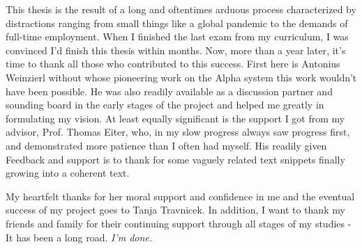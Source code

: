 \documentclass[draft,final]{vutinfth} %
\theoremstyle{definition}
\begin{document}
\begin{acknowledgements*}
This thesis is the result of a long and oftentimes arduous process characterized by distractions ranging from small things like a global pandemic to the demands of full-time employment. When I finished the last exam from my curriculum, I was convinced I'd finish this thesis within months. Now, more than a year later, it's time to thank all those who contributed to this success. First here is Antonius Weinzierl without whose pioneering work on the Alpha system this work wouldn't have been possible. He was also readily available as a discussion partner and sounding board in the early stages of the project and helped me greatly in formulating my vision. At least equally significant is the support I got from my advisor, Prof. Thomas Eiter, who, in my slow progress always saw progress first, and demonstrated more patience than I often had myself. His readily given Feedback and support is to thank for some vaguely related text snippets finally growing into a coherent text.

My heartfelt thanks for her moral support and confidence in me and the eventual success of my project goes to Tanja Travnicek. In addition, I want to thank my friends and family for their continuing support through all stages of my studies - It has been a long road. \emph{I'm done.}
\end{acknowledgements*}
\end{document}
